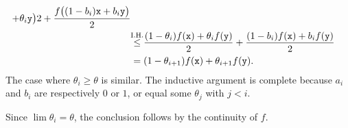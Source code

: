 \begin{rem}
\begin{align*}
{                        + \theta_i\vect y\big)}2
                        + \dfrac{f\big((1-b_i)\vect x
                        + b_i\vect y\big)}2
                \\
            &\stackrel{\mathclap{\mathrm{I.H.}}}\le
                \dfrac{(1-\theta_i)f(\vect x)
                        + \theta_if(\vect y)}2
                        + \dfrac{(1-b_i)f(\vect x)
                        + b_if(\vect y)}2\\
            &= (1-\theta_{i+1})f(\vect x)
                + \theta_{i+1}f(\vect y).
    \end{align*}
    The case where $\theta_i\ge\theta$ is similar. The inductive argument is complete because $a_i$ and $b_i$ are respectively $0$ or $1$, or equal some $\theta_j$ with $j< i$.

    Since $\lim\theta_i=\theta$, the conclusion follows by the continuity of $f$.
\end{rem}